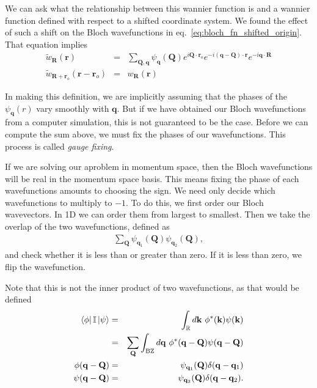\documentclass{article}
\newcommand{\matrixel}[3]{\left< #1 \vphantom{#2#3} \right|
 #2 \left| #3 \vphantom{#1#2} \right>} %
\theoremstyle{definition}
\begin{document}
We can ask what the relationship between this wannier function is and a wannier function defined with respect to a shifted coordinate system. We found the effect of such a shift on the Bloch wavefunctions in eq.~\ref{eq:bloch_fn_shifted_origin}. That equation implies
\begin{eqnarray}
\tilde{w}_\mathbf{R}(\mathbf{r}) &=& \sum_{\mathbf{Q}, \mathbf{q}} \psi_\mathbf{q}(\mathbf{Q}) e^{i \mathbf{Q} \cdot \mathbf{r}_o} e^{-i(\mathbf{q} - \mathbf{Q}) \cdot \mathbf{r}} e^{-i \mathbf{q} \cdot \mathbf{R}}\\
\tilde{w}_{\mathbf{R} + \mathbf{r}_o}(\mathbf{r} - \mathbf{r}_o) &=& w_\mathbf{R}(\mathbf{r}) 
\end{eqnarray}

In making this definition, we are implicitly assuming that the phases of the $\psi_\mathbf{q}(r)$ vary smoothly with $\mathbf{q}$. But if we have obtained our Bloch wavefunctions from a computer simulation, this is not guaranteed to be the case. Before we can compute the sum above, we must fix the phases of our wavefunctions. This process is called \emph{gauge fixing}.

If we are solving our aproblem in momentum space, then the Bloch wavefunctions will be real in the momentum space basis. This means fixing the phase of each wavefunctions amounts to choosing the sign. We need only decide which wavefunctions to multiply to $-1$. To do this, we first order our Bloch wavevectors. In 1D we can order them from largest to smallest. Then we take the overlap of the two wavefunctions, defined as 
\begin{eqnarray}
\sum_\mathbf{Q} \psi_{\mathbf{q}_1}(\mathbf{Q}) \psi_{\mathbf{q}_2}(\mathbf{Q}),
\end{eqnarray}
 and check whether it is less than or greater than zero. If it is less than zero, we flip the wavefunction.

Note that this is not the inner product of two wavefunctions, as that would be defined
\begin{eqnarray}
\matrixel{\phi}{\mathbb{I}}{\psi} &=& \int_\mathbb{R} d\mathbf{k} \ \phi^*(\mathbf{k})\psi(\mathbf{k})\\
&=&  \sum_\mathbf{Q} \int_{\text{BZ}} d\mathbf{q} \ \phi^*(\mathbf{q} - \mathbf{Q}) \psi(\mathbf{q} - \mathbf{Q})\\
\phi(\mathbf{q} - \mathbf{Q}) &=& \psi_{\mathbf{q}_1}(\mathbf{Q}) \delta(\mathbf{q} - \mathbf{q}_1)\\
\psi(\mathbf{q} - \mathbf{Q}) &=& \psi_{\mathbf{q}_2}(\mathbf{Q}) \delta(\mathbf{q} - \mathbf{q}_2).
\end{eqnarray}
 
\end{document}
